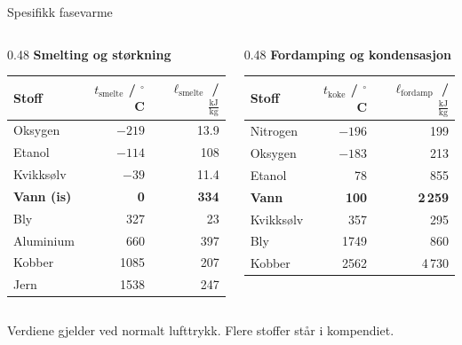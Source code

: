 \documentclass[aspectratio=169, 12pt]{beamer}
\begin{document}
\begin{frame}{Spesifikk fasevarme}

  \begin{columns}[T]
    \begin{column}{0.48\textwidth}
      \centering
      \textbf{Smelting og størkning}\\[3pt]
      \small
      \begin{tabular}{lrr}
        \hline
        Stoff & $t_\text{smelte}$ / $^\circ$C & $\ell_\text{smelte}$ / $\mathrm{\tfrac{kJ}{kg}}$ \\
        \hline
        Oksygen   & $-219$ & 13.9 \\
        Etanol    & $-114$ & 108 \\
        Kvikksølv & $-39$  & 11.4 \\
        \textbf{Vann (is)} & \textbf{0} & \textbf{334} \\
        Bly       & 327    & 23 \\
        Aluminium & 660    & 397 \\
        Kobber    & 1085   & 207 \\
        Jern      & 1538   & 247 \\
        \hline
      \end{tabular}
    \end{column}
    \begin{column}{0.48\textwidth}
      \centering
      \textbf{Fordamping og kondensasjon}\\[3pt]
      \small
      \begin{tabular}{lrr}
        \hline
        Stoff & $t_\text{koke}$ / $^\circ$C & $\ell_\text{fordamp}$ / $\mathrm{\tfrac{kJ}{kg}}$ \\
        \hline
        Nitrogen  & $-196$ & 199 \\
        Oksygen   & $-183$ & 213 \\
        Etanol    & 78     & 855 \\
        \textbf{Vann} & \textbf{100} & \textbf{2\,259} \\
        Kvikksølv & 357    & 295 \\
        Bly       & 1749   & 860 \\
        Kobber    & 2562   & 4\,730 \\
        \hline
      \end{tabular}
    \end{column}
  \end{columns}
  \medskip
  {\small Verdiene gjelder ved normalt lufttrykk. Flere stoffer står i kompendiet.}

\end{frame}
\end{document}
